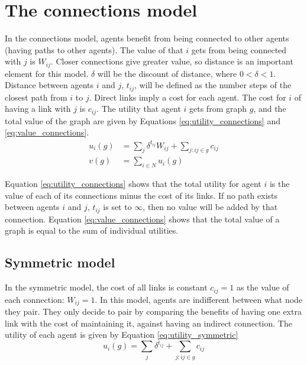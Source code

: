 \documentclass[a4paper, 11pt]{article}
\begin{document}
\section*{The connections model}
In the connections model, agents benefit from being connected to other agents (having paths to other agents). The value of that $i$ gets from being connected with $j$ is $W_{ij}$. Closer connections give greater value, so distance is an important element for this model. $\delta$ will be the discount of distance, where $0 < \delta < 1$. Distance between agents $i$ and $j$, $t_{ij}$, will be defined as the number steps of the closest path from $i$ to $j$. Direct links imply a cost for each agent. The cost for $i$ of having a link with $j$ is $c_{ij}$. The utility that agent $i$ gets from graph $g$, and the total value of the graph are given by Equations \ref{eq:utility_connections} and \ref{eq:value_connections}.
\begin{align} 
u_{i}(g) &= \sum_{j}{\delta^{t_{ij}}W_{ij}} + \sum_{j: ij \in g}{c_{ij}} \label{eq:utility_connections}\\
v(g) &= \sum_{i \in N}{u_{i}(g)} \label{eq:value_connections}
\end{align}

Equation \ref{eq:utility_connections} shows that the total utility for agent $i$ is the value of each of its connections minus the cost of its links. If no path exists between agents $i$ and $j$, $t_{ij}$ is set to $\infty$, then no value will be added by that connection. Equation \ref{eq:value_connections} shows that the total value of a graph is equal to the sum of individual utilities.

\subsection*{Symmetric model}
In the symmetric model, the cost of all links is constant $c_{ij} = 1$ as the value of each connection: $W_{ij} = 1$. In this model, agents are indifferent between what node they pair. They only decide to pair by comparing the benefits of having one extra link with the cost of maintaining it, against having an indirect connection. The utility of each agent is given by Equation \ref{eq:utility_symmetric}
\begin{equation}
	u_{i}(g) = \sum_{j}{\delta^{t_{ij}}} + \sum_{j: ij \in g}{c_{ij}} \label{eq:utility_symmetric}
\end{equation}
\end{document}
